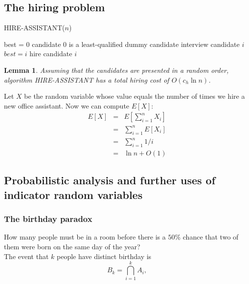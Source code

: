 \documentclass[12pt]{article}
\newtheorem{lemma}[theorem]{Lemma}
\begin{document}
\subsection{The hiring problem}

HIRE-ASSISTANT($n$)
\begin{algorithmic}[1]
\State best = 0
\Comment candidate $0$ is a least-qualified dummy candidate
	\State interview candidate $i$
        	\State $best = i$
                \State hire candidate $i$
        \EndIf
\EndFor
\end{algorithmic}

\begin{lemma}
  Assuming that the candidates are presented in a random order, algorithm HIRE-ASSISTANT has a total hiring cost of $O(c_h \ln n)$.
\end{lemma}

Let $X$ be the random variable whose value equals the number of times we hire a new office assistant. Now we can compute $E[X]$:
\begin{eqnarray*}
  E[X]
  &=& E \left[ \sum_{i=1}^n X_i \right] \\
  &=& \sum_{i=1}^n E[X_i] \\
  &=& \sum_{i=1}^n 1/i \\
  &=& \ln n + O(1)
\end{eqnarray*}

\subsection{Probabilistic analysis and further uses of indicator random variables}

\subsubsection{The birthday paradox}

How many people must be in a room before there is a $50 \%$ chance that two of them were born on the same day of the year? \\

The event that $k$ people have distinct birthday is
\begin{equation*}
  B_k = \bigcap_{i=1}^k A_i,
\end{equation*}
\end{document}
